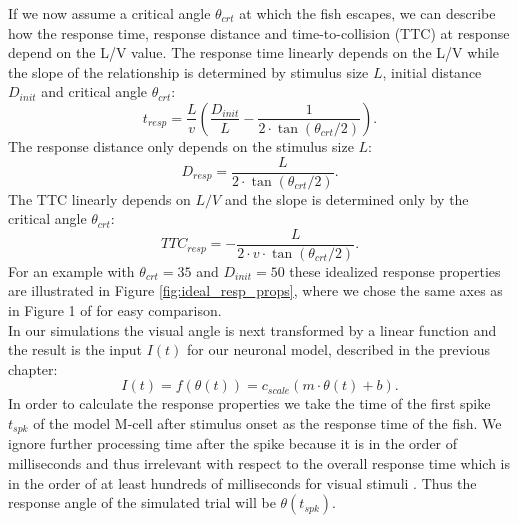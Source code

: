 \documentclass[a4paper,10pt,hidelinks]{scrreprt}
\begin{document}
    If we now assume a critical angle $\theta_{crt}$ at which the fish escapes, we can describe how the response time, response distance and time-to-collision (TTC) at response depend on the L/V value.
    The response time linearly depends on the L/V while the slope of the relationship is determined by stimulus size $L$, initial distance $D_{init}$ and critical angle $\theta_{crt}$:
	\begin{equation}
	t_{resp} = \dfrac{L}{v} \left(\dfrac{D_{init}}{L} - \dfrac{1}{2\cdot\tan(\theta_{crt} /2)}\right).
	\label{eq:resp_time}
	\end{equation}
    The response distance only depends on the stimulus size $L$:
    \begin{equation}
	D_{resp} = \dfrac{L}{2\cdot \tan(\theta_{crt} /2)}.
	\label{eq:resp_dist}
	\end{equation}
    The TTC linearly depends on $L/V$ and the slope is determined only by the critical angle $\theta_{crt}$:
	\begin{equation}
	TTC_{resp} = - \dfrac{L}{2\cdot v\cdot \tan(\theta_{crt} /2)}.
	\label{eq:resp_ttc}
	\end{equation}
    For an example with $\theta_{crt}=35$ and $D_{init}=50$ these idealized response properties are illustrated in Figure \ref{fig:ideal_resp_props}, where we chose the same axes as in Figure 1 of \cite{Bhattacharyya2017} for easy comparison.\\
	In our simulations the visual angle is next transformed by a linear function and the result is the input $I(t)$ for our neuronal model, described in the previous chapter:
	\begin{equation}
	I(t) = f(\theta (t)) = c_{scale}(m \cdot \theta(t) + b).
	\label{eq:input}
	\end{equation}
	In order to calculate the response properties we take the time of the first spike $t_{spk}$ of the model M-cell after stimulus onset as the response time of the fish.
	We ignore further processing time after the spike because it is in the order of milliseconds \citep{Preuss2003} and thus irrelevant with respect to the overall response time which is in the order of at least hundreds of milliseconds for visual stimuli \citep{Preuss2006}.
	Thus the response angle of the simulated trial will be $\theta (t_{spk})$.
	
\end{document}
